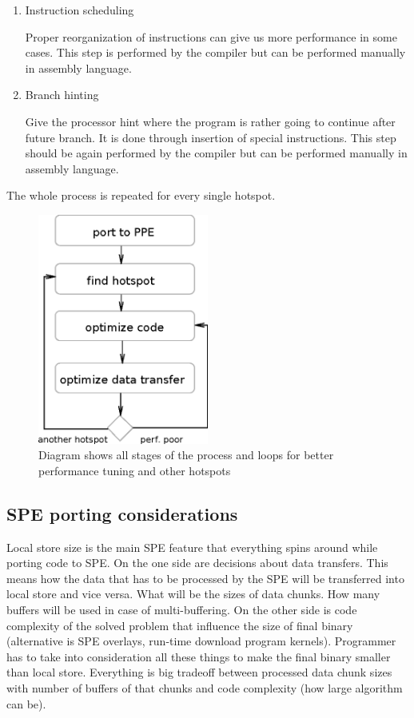 \begin{enumerate}
\item{Instruction scheduling}
\par
Proper reorganization of instructions can give us more performance in some cases.
This step is performed by the compiler but can be performed manually in assembly language.

\item{Branch hinting}
\par
Give the processor hint where the program is rather going to continue after future branch.
It is done through insertion of special instructions.
This step should be again performed by the compiler but can be performed manually in assembly language.
\end{enumerate}

\par
The whole process is repeated for every single hotspot.

\begin{figure}
    \centering
    \includegraphics[width=0.5\textwidth]{data/portingCycle}
    \caption[Application porting cycle]{Diagram shows all stages of the process and loops for better performance tuning and other hotspots}
    \label{fg:appPorting}
\end{figure}

\subsection {SPE porting considerations}

\par
Local store size is the main SPE feature that everything spins around while porting code to SPE.
On the one side are decisions about data transfers.
This means how the data that has to be processed by the SPE will be transferred into local store and vice versa.
What will be the sizes of data chunks.
How many buffers will be used in case of multi-buffering.
On the other side is code complexity of the solved problem that influence the size of final binary (alternative is SPE overlays, run-time download program kernels).
Programmer has to take into consideration all these things to make the final binary smaller than local store.
Everything is big tradeoff between processed data chunk sizes with number of buffers of that chunks and code complexity (how large algorithm can be).

